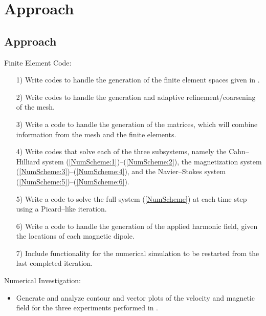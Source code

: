 \documentclass[9pt]{beamer}
\begin{document}
\section{Approach}
\begin{frame}
\section{Approach}
Finite Element Code:
\begin{itemize}
	\item[1)] Write codes to handle the generation of the finite element spaces given in \cite{DiffuseInterface}. 
	
	\item[2)] Write codes to handle the generation and adaptive refinement/coarsening of the mesh.
	
	\item[3)] Write a code to handle the generation of the matrices, which will combine information from the mesh and the finite elements. 
	
	\item[4)] Write codes that solve each of the three subsystems, namely the Cahn--Hilliard system (\ref{NumScheme:1})--(\ref{NumScheme:2}), the magnetization system (\ref{NumScheme:3})--(\ref{NumScheme:4}), and the Navier--Stokes system (\ref{NumScheme:5})--(\ref{NumScheme:6}).
	
	\item[5)] Write a code to solve the full system (\ref{NumScheme}) at each time step using a Picard--like iteration.
	
	\item[6)] Write a code to handle the generation of the applied harmonic field, given the locations of each magnetic dipole.
	
	\item[7)] Include functionality for the numerical simulation to be restarted from the last completed iteration.
\end{itemize}
Numerical Investigation:
\begin{itemize}
	\item Generate and analyze contour and vector plots of the velocity and magnetic field for the three experiments performed in \cite{DiffuseInterface}.
\end{itemize}
\end{frame}
\end{document}

